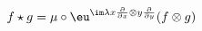 \begin{equation}
    \label{eq:QPstar}
    f \star g = \mu \circ 
    \eu^{\im\lambda x\frac{\partial}{\partial x}
      \otimes y\frac{\partial}{\partial y}} (f \otimes g)
\end{equation}

